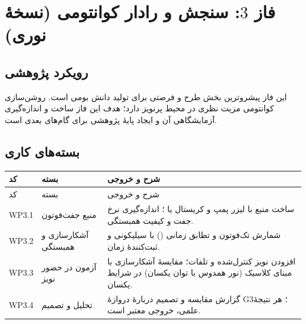 \section{فاز $3$: سنجش و رادار کوانتومی (نسخهٔ نوری)}
\label{sec:phase3}
\subsection{رویکرد پژوهشی}
این فاز پیشروترین بخش طرح و فرصتی برای تولید دانش بومی است. روشن‌سازی کوانتومی مزیت نظری در محیط پرنویز دارد\cite{tan}؛ هدف این فاز ساخت و اندازه‌گیری آزمایشگاهی آن و ایجاد پایهٔ پژوهشی برای گام‌های بعدی است.

\subsection{بسته‌های کاری}
\begin{longtable}{R{1.45cm}R{3.88cm}R{9.70cm}}
\toprule {} کد & بسته & شرح و خروجی \\ \midrule
\endfirsthead
\toprule {} کد & بسته & شرح و خروجی \\ \midrule
\endhead
WP3.1 & منبع جفت‌فوتون & ساخت منبع  با لیزر پمپ و کریستال  یا ؛ اندازه‌گیری نرخ جفت و کیفیت همبستگی. \\
WP3.2 & آشکارسازی و همبستگی & شمارش تک‌فوتون و تطابق زمانی () با  سیلیکونی و ثبت‌کنندهٔ زمان. \\
WP3.3 & آزمون در حضور نویز & افزودن نویز کنترل‌شده و تلفات؛ مقایسهٔ آشکارسازی با مبنای کلاسیک (نور همدوس با توان یکسان) در شرایط یکسان. \\
WP3.4 & تحلیل و تصمیم & گزارش مقایسه و تصمیم دربارهٔ دروازهٔ G3؛ هر نتیجهٔ علمی، خروجی معتبر است. \\
\bottomrule\end{longtable}


